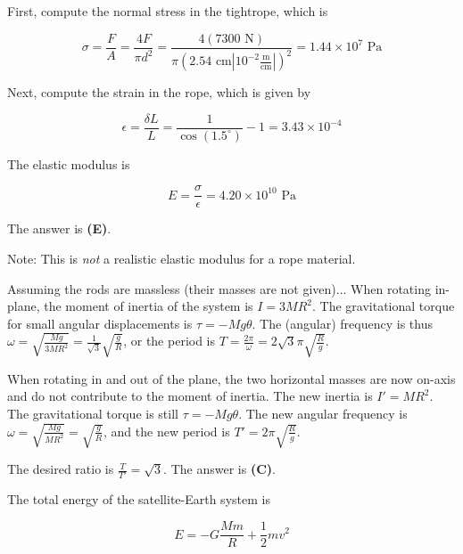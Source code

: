 \documentclass[12pt]{article}
\begin{document}
\vspace{2 \baselineskip}



First, compute the normal stress in the tightrope, which is

$$\sigma = \frac{F}{A} = \frac{4 F}{\pi d^2} = \frac{4 (7300 \text{ N})}{\pi \left( 2.54 \text{ cm} \left| 10^{-2} \frac{\text{m}}{\text{cm}} \right| \right)^2} = 1.44 \times 10^{7} \text{ Pa}$$

Next, compute the strain in the rope, which is given by

$$\epsilon = \frac{\delta L}{L} = \frac{1}{\cos (1.5^\circ)} - 1 = 3.43 \times 10^{-4}$$

The elastic modulus is

$$E = \frac{\sigma}{\epsilon} = 4.20 \times 10^{10} \text{ Pa}$$

The answer is \textbf{(E)}.

Note: This is \textit{not} a realistic elastic modulus for a rope material.


\vspace{2 \baselineskip}


Assuming the rods are massless (their masses are not given)... When rotating in-plane, the moment of inertia of the system is $I = 3 M R^2$. The gravitational torque for small angular displacements is $\tau = -M g \theta$. The (angular) frequency is thus $\omega = \sqrt{\frac{M g}{3 M R^2}} = \frac{1}{\sqrt{3}} \sqrt{\frac{g}{R}}$, or the period is $T = \frac{2 \pi}{\omega} = 2 \sqrt{3} \pi \sqrt{\frac{R}{g}}$.

When rotating in and out of the plane, the two horizontal masses are now on-axis and do not contribute to the moment of inertia. The new inertia is $I' = M R^2$. The gravitational torque is still $\tau = -M g \theta$. The new angular frequency is $\omega = \sqrt{\frac{M g}{M R^2}} = \sqrt{\frac{g}{R}}$, and the new period is $T' = 2 \pi \sqrt{\frac{R}{g}}$.

The desired ratio is $\frac{T}{T'} = \sqrt{3}$. The answer is \textbf{(C)}.


\vspace{2 \baselineskip}



The total energy of the satellite-Earth system is

$$E = -G \frac{M m}{R} + \frac{1}{2} m v^2$$
\end{document}
